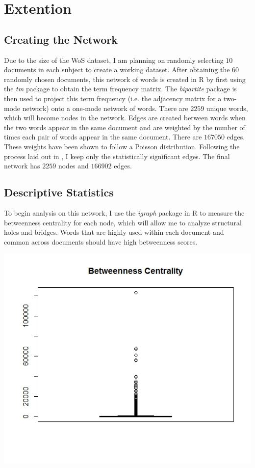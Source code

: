\documentclass[12pt]{article}
\begin{document}
\section{Extention}
\subsection{Creating the Network}
Due to the size of the WoS dataset, I am planning on randomly selecting $10$ documents in each subject to create a working dataset. After obtaining the $60$ randomly chosen documents, this network of words is created in R by first using the \textit{tm} package to obtain the term frequency matrix. The \textit{bipartite} package is then used to project this term frequency (i.e. the adjacency matrix for a two-mode network) onto a one-mode network of words. There are $2259$ unique words, which will become nodes in the network. Edges are created between words when the two words appear in the same document and are weighted by the number of times each pair of words appear in the same document. There are $167050$ edges. These weights have been shown to follow a Poisson distribution. Following the process laid out in \cite{mainExtra}, I keep only the statistically significant edges. The final network has $2259$ nodes and $166902$ edges. 
  
\subsection{Descriptive Statistics}
To begin analysis on this network, I use the \textit{igraph} package in R to measure the betweenness centrality for each node, which will allow me to analyze structural holes and bridges. Words that are highly used within each document and common across documents should have high betweenness scores.
 
\vspace{2mm}
\begin{center}
	\includegraphics[scale=0.5]{Images/plot_between.jpeg}
\end{center} 
\vspace{2mm}  
\end{document}
